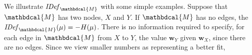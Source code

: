 \documentclass[letterpaper]{article} %
\theoremstyle{plain}
\theoremstyle{definition}
\theoremstyle{remark}
\newcommand\mat[1]{\mathbf{#1}}
\newcommand{\commentout}[1]{\ignorespaces}
\newcommand{\dg}[1]{\mathbdcal{#1}}
\newcommand{\IDef}[1]{\mathit{IDef}_{#1}}
\begin{document}
We illustrate $\IDef{\dg M}$ with some simple examples.  
%
\commentout{
	
  This approach combines the benefits of choosing
the maximum-entropy distribution consistent with
constraints \cite{Jaynes57}, while also providing the ability to back off of this (e.g., by providing a universal graph structure), and simultaneously providing a way of articulating qualitative independences.
There is no information required
}
Suppose that $\dg M$ has two nodes, $X$ and $Y$.  
If $\dg M$ has no edges, the $\IDef{\dg M}(\mu) = - H(\mu)$.
There is no information required to specify, for each edge in ${\dg
  M}$ from $X$ to
$Y$, the value ${\mat w}_Y$ given ${\mat w}_X$, since there are no
edges.
Since we view smaller numbers as representing a better fit,
\end{document}

